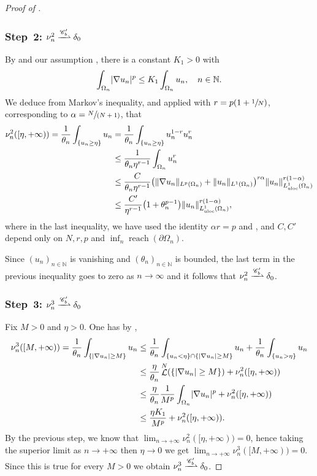 \documentclass[10pt]{amsart}
\newcommand{\spfrac}[2]{{\sfrac{#1}{(#2)}}}
\theoremstyle{plain}
\theoremstyle{definition}
\newcommand{\N}{\mathbb{N}}
\newcommand{\Cspace}{\mathscr{C}}
\newcommand{\uloc}{L^1_\mathrm{uloc}}
\DeclarePairedDelimiter{\abs}{\lvert}{\rvert}
\DeclarePairedDelimiter{\norm}{\lVert}{\rVert}
\DeclareMathOperator{\lbm}{\mathcal{L}}
\DeclareMathOperator{\reach}{reach}
\newcommand{\narrowto}{\xrightharpoonup{\Cspace_b'}}
\begin{document}
\begin{proof}[Proof of ]
\subsubsection*{Step~2: $\nu_n^2 \narrowto \delta_{0}$} By  and our assumption , there is a constant \(K_1>0\) with
\begin{equation}
\label{nonHomogeneousSobolev}
\int_{\Omega_n}\abs{\nabla u_n}^p\leq K_1\int_{\Omega_n}u_n,\quad n\in\N.
\end{equation}
We deduce from Markov's inequality, and  applied with \(r=p(1+\sfrac 1N)\), corresponding to \(\alpha=\spfrac{N}{N+1}\), that
\begin{align*}
\nu^2_n([\eta,+\infty)) = \frac 1{\theta_n} \int_{\{u_n \geq \eta\}} u_n&= \frac 1{\theta_n} \int_{\{u_n \geq \eta\}} u_n^{1-r}u_n^r
\\
&\leq \frac{1}{\theta_n\eta^{r-1}}\int_{\Omega_n}u_n^r\\
&\leq \frac{C}{\theta_n\eta^{r-1}} \bigl(\norm{\nabla u_n}_{L^p(\Omega_n)}+\norm{u_n}_{L^1(\Omega_n)}\bigr)^{r\alpha} \norm{u_n}_{\uloc({\Omega}_n)}^{r(1-\alpha)}\\
&\leq \frac{C'}{\eta^{r-1}} \bigl(1+\theta_n^{p-1}\bigr)\norm{u_n}_{\uloc({\Omega}_n)}^{r(1-\alpha)},
\end{align*}
where in the last inequality, we have used the identity \(\alpha r=p\) and , and $C,C'$ depend only on $N,r,p$ and $\inf_n \reach(\partial \Omega_n)$.

Since \((u_n)_{n\in\N}\) is vanishing and \((\theta_n)_{n\in\N}\) is bounded, the last term in the previous inequality goes to zero as \(n\to\infty\) and it follows that $\nu_n^2 \narrowto \delta_0$.

\subsubsection*{Step~3: $\nu_n^3 \narrowto \delta_{0}$} Fix $M > 0$ and $\eta > 0$. One has by ,
\begin{align*}
\nu_n^3([M,+\infty)) = \frac 1{\theta_n} \int_{\{\abs{\nabla u_n} \geq M\}} u_n &\leq \frac 1{\theta_n} \int_{\{u_n < \eta\}\cap\{\abs{\nabla u_n} \geq M\}} u_n + \frac 1{\theta_n} \int_{\{u_n > \eta\}} u_n\\
&\leq \frac \eta{\theta_n} \lbm^N(\{\abs{\nabla u_n} \geq M\}) + \nu_n^2([\eta,+\infty))\\
&\leq \frac\eta{\theta_n} \frac 1{M^p} \int_{\Omega_n} \abs{\nabla u_n}^p + \nu_n^2([\eta,+\infty))\\
&\leq \frac{\eta K_1}{M^p}+ \nu_n^2([\eta,+\infty)).
\end{align*}
By the previous step, we know that $\lim_{n\to+\infty} \nu_n^2([\eta,+\infty)) = 0$, hence taking the superior limit as $n\to+\infty$ then $\eta \to 0$ we get
\(\lim_{n\to+\infty} \nu_n^3([M,+\infty)) = 0\).
Since this is true for every $M > 0$ we obtain $\nu_n^3 \narrowto \delta_0$.


\end{proof}
\end{document}
